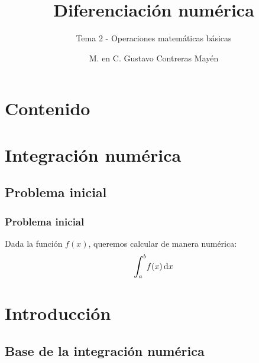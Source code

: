 \documentclass[12pt]{beamer}
\title{\large{Diferenciación numérica}}
\subtitle{Tema 2 - Operaciones matemáticas básicas}
\author{M. en C. Gustavo Contreras Mayén}
\date{}
\begin{document}
\maketitle

\section*{Contenido}

\section{Integración numérica}
\subsection{Problema inicial}

\begin{frame}
\frametitle{Problema inicial}
Dada la función $f (x)$, queremos calcular de manera numérica:
\begin{align*}
\scaleint{6ex}_{\bs a}^{b} f (x) \dd{x}
\end{align*}
\end{frame}

\section{Introducción}
\subsection{Base de la integración numérica}
\end{document}
